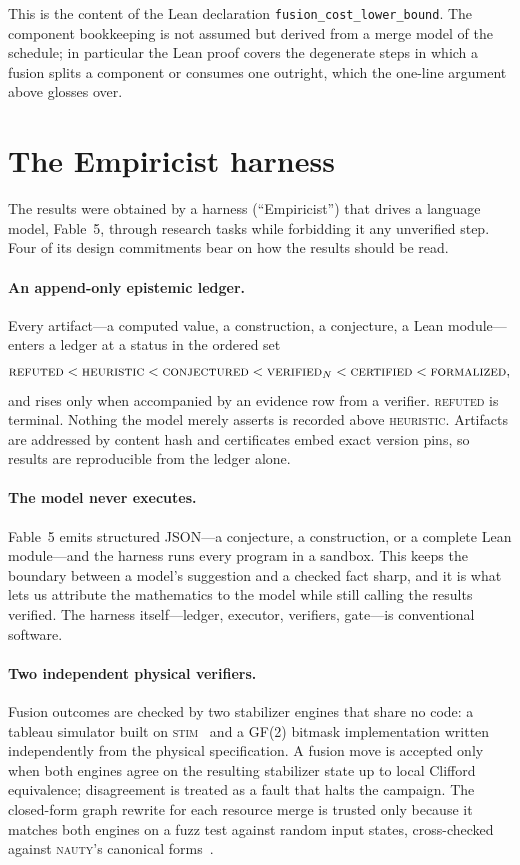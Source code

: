 \documentclass[11pt]{article}
\theoremstyle{definition}
\theoremstyle{remark}
\newcommand{\N}{N}
\newcommand{\code}[1]{\texttt{#1}}
\begin{document}
This is the content of the Lean declaration \code{fusion\_cost\_lower\_bound}. The component
bookkeeping is not assumed but derived from a merge model of the schedule; in particular the Lean
proof covers the degenerate steps in which a fusion splits a component or consumes one outright,
which the one-line argument above glosses over.

\section{The Empiricist harness}\label{sec:methods}

The results were obtained by a harness (``Empiricist'') that drives a language model, Fable~5,
through research tasks while forbidding it any unverified step. Four of its design commitments bear
on how the results should be read.

\paragraph{An append-only epistemic ledger.} Every artifact---a computed value, a construction, a
conjecture, a Lean module---enters a ledger at a status in the ordered set
\[
  \textsc{refuted}<\textsc{heuristic}<\textsc{conjectured}<\textsc{verified}_{\N}<\textsc{certified}<\textsc{formalized},
\]
and rises only when accompanied by an evidence row from a verifier. \textsc{refuted} is terminal.
Nothing the model merely asserts is recorded above \textsc{heuristic}. Artifacts are addressed by
content hash and certificates embed exact version pins, so results are reproducible from the ledger
alone.

\paragraph{The model never executes.} Fable~5 emits structured JSON---a conjecture, a construction,
or a complete Lean module---and the harness runs every program in a sandbox. This keeps the
boundary between a model's suggestion and a checked fact sharp, and it is what lets us attribute
the mathematics to the model while still calling the results verified. The harness itself---ledger,
executor, verifiers, gate---is conventional software.

\paragraph{Two independent physical verifiers.} Fusion outcomes are checked by two stabilizer
engines that share no code: a tableau simulator built on \textsc{stim}~\cite{stim} and a GF(2)
bitmask implementation written independently from the physical specification. A fusion move is
accepted only when both engines agree on the resulting stabilizer state up to local Clifford
equivalence; disagreement is treated as a fault that halts the campaign. The closed-form graph
rewrite for each resource merge is trusted only because it matches both engines on a fuzz test
against random input states, cross-checked against \textsc{nauty}'s canonical
forms~\cite{nauty}.
\end{document}
